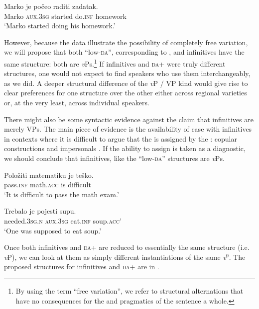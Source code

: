 \documentclass[output=paper,modfonts,newtxmath,hidelinks,]{langscibook}
\begin{document}
\ea \label{7:ex11}
\gll Marko je počeo raditi zadatak.\\
     Marko \textsc{aux.3sg} started do.\textsc{inf} homework\\
\glt `Marko started doing his homework.'
\z

\noindent However, because the data illustrate the possibility of completely free variation, we will propose that both ``low-\textsc{da}'', corresponding to , and infinitives have the same structure: both are \textit{v}Ps.\footnote{\label{7:fn4}By using the term ``free variation'', we refer to structural alternations that have no consequences for the  and pragmatics of the sentence a whole.}  If infinitives and \textsc{da}+ were truly different structures, one would not expect to find speakers who use them interchangeably, as we did. A deeper structural difference of the \textit{v}P / VP kind would give rise to clear preferences for one structure over the other either across regional varieties or, at the very least, across individual speakers.



There might also  be some syntactic evidence against the claim that infinitives are merely VPs. The main piece of evidence is the availability of  case with infinitives in contexts where it is difficult to argue that the  is assigned by the : copular constructions  and impersonals . If the ability to assign  is taken as a diagnostic, we should conclude that infinitives, like the ``low-\textsc{da}'' structures are \textit{v}Ps.

\ea \label{7:ex12}
\gll Položiti matematiku je teško.\\
     pass.\textsc{inf} math.\textsc{acc} is difficult\\
\glt `It is difficult to pass the math exam.'
\z

\ea \label{7:ex13}
\gll Trebalo je pojesti supu.\\
     needed.\textsc{3sg.n} \textsc{aux.3sg} eat.\textsc{inf} soup.\textsc{acc}'\\
\glt `One was supposed to eat soup.'
\z

\noindent Once both infinitives and \textsc{da}+ are reduced to essentially the same structure (i.e. \textit{v}P), we can look at them as simply different instantiations of the same \textit{v$^0$}. The proposed structures for infinitives and \textsc{da}+ are in .\largerpage[-1]
\end{document}
